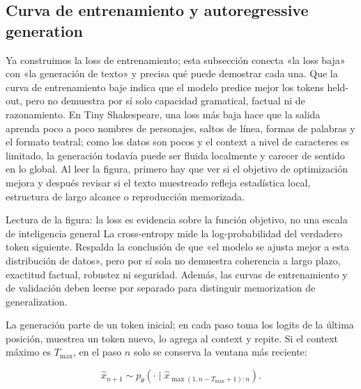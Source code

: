 \subsection{Curva de entrenamiento y autoregressive generation}

Ya construimos la loss de entrenamiento; esta subsección conecta «la loss baja» con «la generación de texto» y precisa qué puede demostrar cada una. Que la curva de entrenamiento baje indica que el modelo predice mejor los tokens held-out, pero no demuestra por sí solo capacidad gramatical, factual ni de razonamiento. En Tiny Shakespeare, una loss más baja hace que la salida aprenda poco a poco nombres de personajes, saltos de línea, formas de palabras y el formato teatral; como los datos son pocos y el context a nivel de caracteres es limitado, la generación todavía puede ser fluida localmente y carecer de sentido en lo global. Al leer la figura, primero hay que ver si el objetivo de optimización mejora y después revisar si el texto muestreado refleja estadística local, estructura de largo alcance o reproducción memorizada.


\begin{warningbox}{Lectura de la figura: la loss es evidencia sobre la función objetivo, no una escala de inteligencia general}
La cross-entropy mide la log-probabilidad del verdadero token siguiente. Respalda la conclusión de que «el modelo se ajusta mejor a esta distribución de datos», pero por sí sola no demuestra coherencia a largo plazo, exactitud factual, robustez ni seguridad. Además, las curvas de entrenamiento y de validación deben leerse por separado para distinguir memorization de generalization.
\end{warningbox}


La generación parte de un token inicial; en cada paso toma los logits de la última posición, muestrea un token nuevo, lo agrega al context y repite. Si el context máximo es $T_{\max}$, en el paso $n$ solo se conserva la ventana más reciente:

\[
\hat x_{n+1}\sim p_\theta(\cdot\mid \hat x_{\max(1,n-T_{\max}+1):n}).
\]

